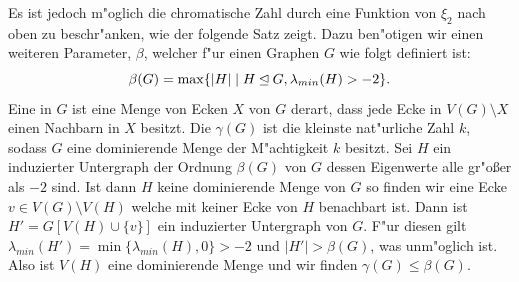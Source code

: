   Es ist jedoch m"oglich die chromatische Zahl durch eine Funktion von $\xi_2$ nach oben zu beschr"anken, wie der folgende Satz zeigt. Dazu ben"otigen wir einen weiteren Parameter, $\beta$, welcher f"ur einen Graphen $G$ wie folgt definiert ist:
  $$\beta(G) = \max\{|H| \;|\; H\unlhd G, \lambda_{min}(H) > -2 \}.$$
  Eine  in $G$ ist eine Menge von Ecken $X$ von $G$ derart, dass jede Ecke in $V(G)\setminus X$ einen Nachbarn in $X$ besitzt. 
  Die  $\gamma(G)$ ist die kleinste nat"urliche Zahl $k$, sodass $G$ eine dominierende Menge der M"achtigkeit $k$ besitzt. 
  Sei $H$ ein induzierter Untergraph der Ordnung $\beta(G)$ von $G$ dessen Eigenwerte alle gr"o{\ss}er als $-2$ sind. Ist dann $H$ keine dominierende Menge von $G$ so finden wir eine Ecke $v\in V(G) \setminus V(H)$ welche mit keiner Ecke von $H$ benachbart ist.
  Dann ist $H'=G[V(H)\cup \{v\}]$ ein induzierter Untergraph von $G$. F"ur diesen gilt $\lambda_{min}(H') = \min\{\lambda_{min}(H), 0\} > -2$ und $|H'| > \beta(G)$, was unm"oglich ist.
  Also ist $V(H)$ eine dominierende Menge und wir finden $\gamma (G) \leq \beta(G)$. 
  
